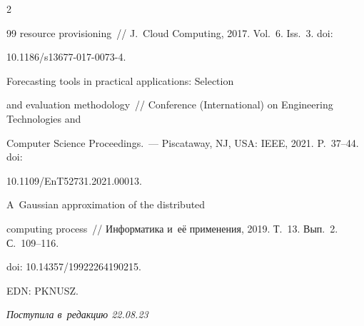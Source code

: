 \begin{multicols}{2}
{{\begin{thebibliography}{99}
resource provisioning~// J.~Cloud Computing, 2017. Vol.~6. Iss.~3. doi:  


10.1186/s13677-017-0073-4.




 Forecasting tools in practical applications: Selection 


and evaluation methodology~// Conference (International) on Engineering Technologies and 


Computer Science Proceedings.~--- Piscataway, NJ, USA: IEEE, 2021. P.~37--44. doi: 


10.1109/EnT52731.2021.00013. 




 A~Gaussian approximation of the distributed 


computing process~// Информатика и~её применения, 2019. Т.~13. Вып.~2. С.~109--116. 


doi: 10.14357/19922264190215. 


EDN: PKNUSZ.





\end{thebibliography}





 }


 }





\end{multicols}





\vspace*{-6pt}





\hfill{\small\textit{Поступила в~редакцию 22.08.23}}















\newpage





\vspace*{-28pt}





